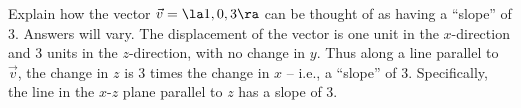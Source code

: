 {Explain how the vector $\vec v=\la 1,0,3\ra$ can be thought of as having a ``slope'' of 3.
}
{
Answers will vary. The displacement of the vector is one unit in the $x$-direction and 3 units in the $z$-direction, with no change in $y$. Thus along a line parallel to $\vec v$, the change in $z$ is 3 times the change in $x$ -- i.e., a ``slope'' of 3. Specifically, the line in the $x$-$z$ plane parallel to $z$ has a slope of 3.
}